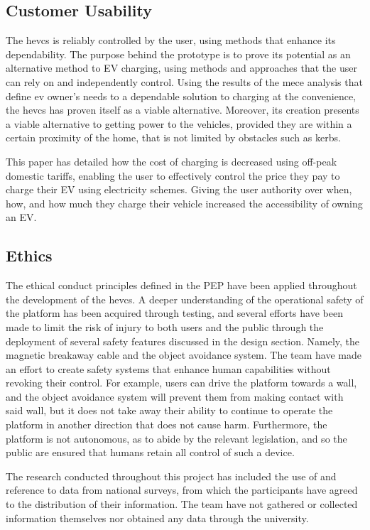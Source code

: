 \documentclass [12pt]{article}
\begin{document}
\subsection{Customer Usability}

The \gls{hevcs} is reliably controlled by the user, using methods that enhance its dependability. The purpose behind the prototype is to prove its potential as an alternative method to EV charging, using methods and approaches that the user can rely on and independently control. Using the results of the \gls{mece} analysis that define \gls{ev} owner’s needs to a dependable solution to charging at the convenience, the \gls{hevcs} has proven itself as a viable alternative. Moreover, its creation presents a viable alternative to getting power to the vehicles, provided they are within a certain proximity of the home, that is not limited by obstacles such as kerbs.

This paper has detailed how the cost of charging is decreased using off-peak domestic tariffs, enabling the user to effectively control the price they pay to charge their EV using electricity schemes. Giving the user authority over when, how, and how much they charge their vehicle increased the accessibility of owning an EV.

\subsection{Ethics}

The ethical conduct principles defined in the PEP have been applied throughout the development of the \gls{hevcs}. A deeper understanding of the operational safety of the platform has been acquired through testing, and several efforts have been made to limit the risk of injury to both users and the public through the deployment of several safety features discussed in the design section. Namely, the magnetic breakaway cable and the object avoidance system. The team have made an effort to create safety systems that enhance human capabilities without revoking their control. For example, users can drive the platform towards a wall, and the object avoidance system will prevent them from making contact with said wall, but it does not take away their ability to continue to operate the platform in another direction that does not cause harm. Furthermore, the platform is not autonomous, as to abide by the relevant legislation, and so the public are ensured that humans retain all control of such a device.

The research conducted throughout this project has included the use of and reference to data from national surveys, from which the participants have agreed to the distribution of their information. The team have not gathered or collected information themselves nor obtained any data through the university.
\end{document}
